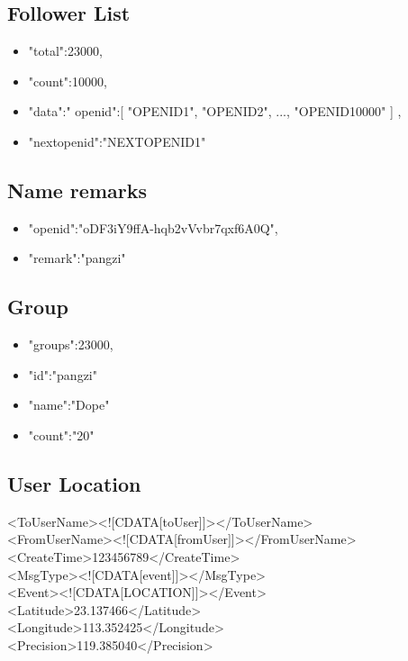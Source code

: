 \documentclass{article}
\begin{document}
\subsection{Follower List}
\begin{itemize}
	\item "total":23000,
	\item "count":10000,
	\item "data":{"
     openid":[
        "OPENID1",
        "OPENID2",
        ...,
        "OPENID10000"
     ]
   },
	\item  "nextopenid":"NEXTOPENID1"
\end{itemize}


\subsection{Name remarks}
\begin{itemize}
	\item "openid":"oDF3iY9ffA-hqb2vVvbr7qxf6A0Q",
	\item "remark":"pangzi"
\end{itemize}

\subsection{Group}
\begin{itemize}
	\item "groups":23000,
	\item "id":"pangzi"
	\item "name":"Dope"
	\item "count":"20"
\end{itemize}

\subsection{User Location}

<ToUserName><![CDATA[toUser]]></ToUserName>\\
<FromUserName><![CDATA[fromUser]]></FromUserName>\\
<CreateTime>123456789</CreateTime>\\
<MsgType><![CDATA[event]]></MsgType>\\
<Event><![CDATA[LOCATION]]></Event>\\
<Latitude>23.137466</Latitude>\\
<Longitude>113.352425</Longitude>\\
<Precision>119.385040</Precision>\\
\end{document}
